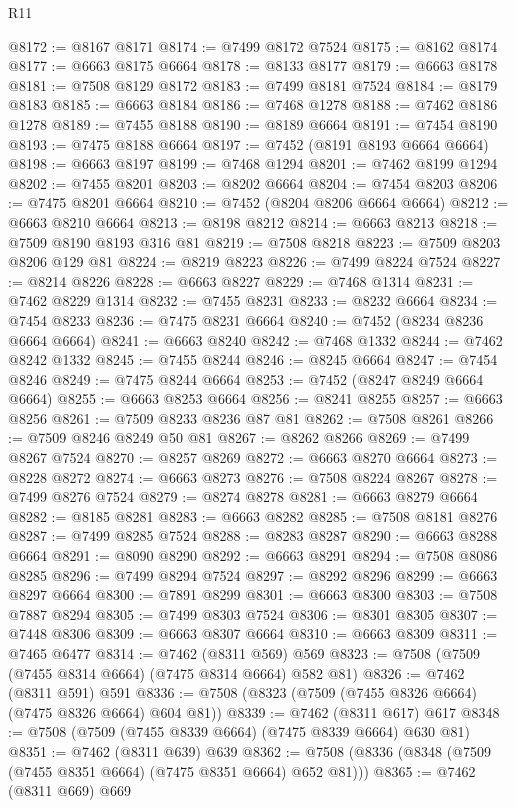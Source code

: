 \begin{lexlean}{R11}
\begin{coremodule}
@8172 := @8167 @8171
@8174 := @7499 @8172 @7524
@8175 := @8162 @8174
@8177 := @6663 @8175 @6664
@8178 := @8133 @8177
@8179 := @6663 @8178
@8181 := @7508 @8129 @8172
@8183 := @7499 @8181 @7524
@8184 := @8179 @8183
@8185 := @6663 @8184
@8186 := @7468 @1278
@8188 := @7462 @8186 @1278
@8189 := @7455 @8188
@8190 := @8189 @6664
@8191 := @7454 @8190
@8193 := @7475 @8188 @6664
@8197 := @7452 (@8191 @8193 @6664 @6664)
@8198 := @6663 @8197
@8199 := @7468 @1294
@8201 := @7462 @8199 @1294
@8202 := @7455 @8201
@8203 := @8202 @6664
@8204 := @7454 @8203
@8206 := @7475 @8201 @6664
@8210 := @7452 (@8204 @8206 @6664 @6664)
@8212 := @6663 @8210 @6664
@8213 := @8198 @8212
@8214 := @6663 @8213
@8218 := @7509 @8190 @8193 @316 @81
@8219 := @7508 @8218
@8223 := @7509 @8203 @8206 @129 @81
@8224 := @8219 @8223
@8226 := @7499 @8224 @7524
@8227 := @8214 @8226
@8228 := @6663 @8227
@8229 := @7468 @1314
@8231 := @7462 @8229 @1314
@8232 := @7455 @8231
@8233 := @8232 @6664
@8234 := @7454 @8233
@8236 := @7475 @8231 @6664
@8240 := @7452 (@8234 @8236 @6664 @6664)
@8241 := @6663 @8240
@8242 := @7468 @1332
@8244 := @7462 @8242 @1332
@8245 := @7455 @8244
@8246 := @8245 @6664
@8247 := @7454 @8246
@8249 := @7475 @8244 @6664
@8253 := @7452 (@8247 @8249 @6664 @6664)
@8255 := @6663 @8253 @6664
@8256 := @8241 @8255
@8257 := @6663 @8256
@8261 := @7509 @8233 @8236 @87 @81
@8262 := @7508 @8261
@8266 := @7509 @8246 @8249 @50 @81
@8267 := @8262 @8266
@8269 := @7499 @8267 @7524
@8270 := @8257 @8269
@8272 := @6663 @8270 @6664
@8273 := @8228 @8272
@8274 := @6663 @8273
@8276 := @7508 @8224 @8267
@8278 := @7499 @8276 @7524
@8279 := @8274 @8278
@8281 := @6663 @8279 @6664
@8282 := @8185 @8281
@8283 := @6663 @8282
@8285 := @7508 @8181 @8276
@8287 := @7499 @8285 @7524
@8288 := @8283 @8287
@8290 := @6663 @8288 @6664
@8291 := @8090 @8290
@8292 := @6663 @8291
@8294 := @7508 @8086 @8285
@8296 := @7499 @8294 @7524
@8297 := @8292 @8296
@8299 := @6663 @8297 @6664
@8300 := @7891 @8299
@8301 := @6663 @8300
@8303 := @7508 @7887 @8294
@8305 := @7499 @8303 @7524
@8306 := @8301 @8305
@8307 := @7448 @8306
@8309 := @6663 @8307 @6664
@8310 := @6663 @8309
@8311 := @7465 @6477
@8314 := @7462 (@8311 @569) @569
@8323 := @7508 (@7509 (@7455 @8314 @6664) (@7475 @8314 @6664) @582 @81)
@8326 := @7462 (@8311 @591) @591
@8336 := @7508 (@8323 (@7509 (@7455 @8326 @6664) (@7475 @8326 @6664) @604 @81))
@8339 := @7462 (@8311 @617) @617
@8348 := @7508 (@7509 (@7455 @8339 @6664) (@7475 @8339 @6664) @630 @81)
@8351 := @7462 (@8311 @639) @639
@8362 := @7508 (@8336 (@8348 (@7509 (@7455 @8351 @6664) (@7475 @8351 @6664) @652 @81)))
@8365 := @7462 (@8311 @669) @669

\end{coremodule}
\end{lexlean}
